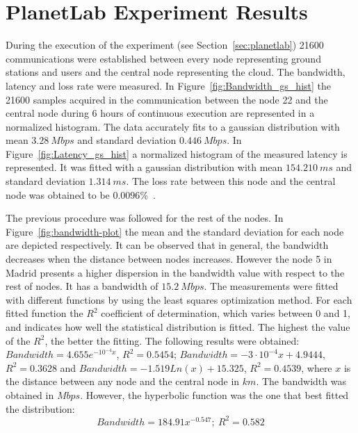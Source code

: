 
\section{PlanetLab Experiment Results}

During the execution of the \pl experiment (see Section~\ref{sec:planetlab}) 21600 communications were established between every node representing ground stations and users and the central node representing the cloud. The bandwidth, latency and loss rate were measured.
In Figure~\ref{fig:Bandwidth_gs_hist} the 21600 samples acquired in the communication between the node 22 and the central node during 6 hours of continuous execution are represented in a normalized histogram. The data accurately fits to a gaussian distribution with mean $3.28~Mbps$ and standard deviation $0.446~Mbps$. In Figure~\ref{fig:Latency_gs_hist} a normalized histogram of the measured latency is represented. It was fitted with a gaussian distribution with mean $154.210~ms$ and standard deviation $1.314~ms$. The loss rate between this node and the central node was obtained to be $0.0096$\%~\cite{Gonzalez2014}.
\begin{figure*}
\begin{center}
\hspace{0.01\textwidth}
\end{center}
\end{figure*}



The previous procedure was followed for the rest of the nodes. In
Figure~\ref{fig:bandwidth-plot} the mean and the standard deviation for each
node are depicted respectively. It can be observed that in general, the bandwidth decreases when the distance between nodes increases. However the node 5 in Madrid presents a higher dispersion in the bandwidth value with respect to the rest of nodes. It has a bandwidth of $15.2~Mbps$. The measurements were fitted with different functions by using the least squares optimization method. For each fitted function the $R^2$ coefficient of determination, which varies between 0 and 1, and indicates how well the statistical distribution is fitted. The highest the value of the $R^2$, the better the fitting. The following results were obtained: $Bandwidth=4.655e^{-10^{-4}x}$, $R^2=0.5454$; $Bandwidth=-3\cdot10^{-4}x+4.9444$, $R^2=0.3628$ and $Bandwidth=-1.519Ln(x)+15.325$, $R^2=0.4539$, where $x$ is the distance between any node and the central node in $km$. The bandwidth was obtained in $Mbps$. However, the hyperbolic function was the one that best fitted the distribution:
\begin{equation}\label{eq:bandwidth_fitting}
Bandwidth=184.91x^{-0.547};~R^2=0.582
\end{equation}

